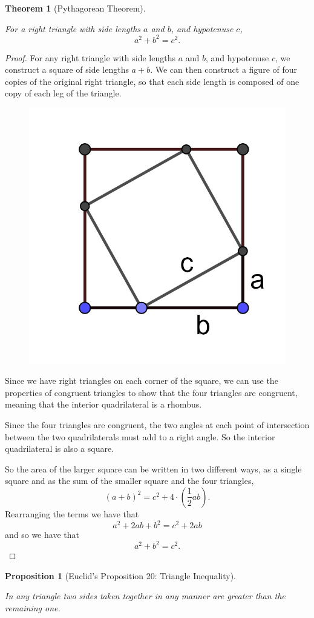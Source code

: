 \documentclass[
]{book}
\newtheorem{theorem}{Theorem}[chapter]
\newtheorem{proposition}{Proposition}[chapter]
\theoremstyle{definition}
\theoremstyle{definition}
\theoremstyle{definition}
\theoremstyle{definition}
\theoremstyle{remark}
\begin{document}
\begin{theorem}[Pythagorean Theorem]
\protect\hypertarget{thm:unlabeled-div-205}{}\label{thm:unlabeled-div-205}

For a right triangle with side lengths \(a\) and \(b\), and hypotenuse \(c\),
\[a^2+b^2=c^2.\]

\end{theorem}

\begin{proof}

For any right triangle with side lengths \(a\) and \(b\), and hypotenuse \(c\), we construct a square of side lengths \(a+b\). We can then construct a figure of four copies of the original right triangle, so that each side length is composed of one copy of each leg of the triangle.

\begin{figure}

{\centering \includegraphics[width=0.2\linewidth]{images/pythagorean1} 

}

\end{figure}

Since we have right triangles on each corner of the square, we can use the properties of congruent triangles to show that the four triangles are congruent, meaning that the interior quadrilateral is a rhombus.

Since the four triangles are congruent, the two angles at each point of intersection between the two quadrilaterals must add to a right angle. So the interior quadrilateral is also a square.

So the area of the larger square can be written in two different ways, as a single square and as the sum of the smaller square and the four triangles, \[(a+b)^2 = c^2 + 4 \cdot \left( \frac{1}{2} ab \right) .\]
Rearranging the terms we have that \[a^2+2ab+b^2 = c^2+2ab\] and so we have that \[a^2+b^2=c^2.\]

\end{proof}

\begin{proposition}[Euclid's Proposition 20: Triangle Inequality]
\protect\hypertarget{prp:prop20}{}\label{prp:prop20}

In any triangle two sides taken together in any manner are greater than the remaining one.

\end{proposition}
\end{document}
